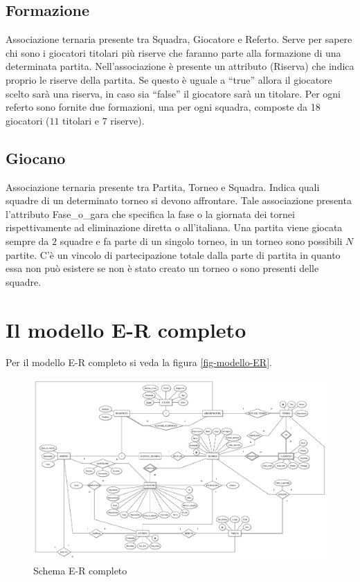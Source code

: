	\subsection{Formazione}
	Associazione ternaria presente tra Squadra, Giocatore e Referto.
	Serve per sapere chi sono i giocatori titolari più riserve che faranno parte alla formazione di una determinata partita.
	Nell’associazione è presente un attributo (Riserva) che indica proprio le riserve della partita.
	Se questo è uguale a ``true'' allora il giocatore scelto sarà una riserva, in caso sia ``false'' il giocatore sarà un titolare.
	Per ogni referto sono fornite due formazioni, una per ogni squadra, composte da 18 giocatori ($11$ titolari e $7$ riserve).
	
	\subsection{Giocano}
	Associazione ternaria presente tra Partita, Torneo e Squadra.
	Indica quali squadre di un determinato torneo si devono affrontare. Tale associazione presenta l’attributo Fase\_o\_gara che specifica la fase o la giornata dei tornei rispettivamente ad eliminazione diretta o all’italiana. Una partita viene giocata sempre da $2$ squadre e fa parte di un singolo torneo, in un torneo sono possibili $N$ partite. C’è un vincolo di partecipazione totale dalla parte di partita in quanto essa non può esistere se non è stato creato un torneo o sono presenti delle squadre.
	

\section{Il modello E-R completo}
Per il modello E-R completo si veda la figura \vref{fig-modello-ER}.


\begin{figure}[h]
	\centering
	\includegraphics[height=1\textwidth,
	angle=90]
	{immagini/diagramma-ER-completo}
	
	\caption{Schema E-R completo}
	
	\label{fig-modello-ER}
\end{figure}	